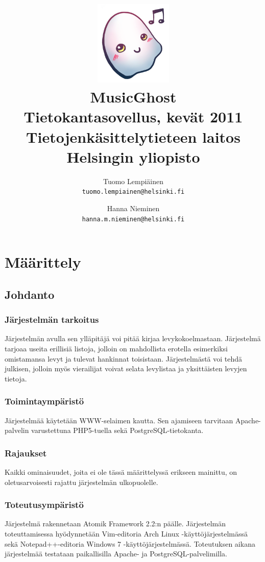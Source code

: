 \documentclass[a4paper,12pt]{report}
\title{\includegraphics[width=5em]{logo}\\\vspace{1em}MusicGhost\\\vspace{1em}
  \large{Tietokantasovellus, kevät 2011\\Tietojenkäsittelytieteen
  laitos\\Helsingin yliopisto}\\}
\author{Tuomo Lempiäinen\\\texttt{tuomo.lempiainen@helsinki.fi} \and
Hanna Nieminen\\\texttt{hanna.m.nieminen@helsinki.fi}}
\begin{document}
\maketitle

\tableofcontents

\chapter{Määrittely}

\section{Johdanto}

\subsection{Järjestelmän tarkoitus}

Järjestelmän avulla sen ylläpitäjä voi pitää kirjaa levykokoelmastaan.
Järjestelmä tarjoaa useita erillisiä listoja, jolloin on mahdollista
erotella esimerkiksi omistamansa levyt ja tulevat hankinnat toisistaan.
Järjestelmästä voi tehdä julkisen, jolloin myös vierailijat voivat selata
levylistaa ja yksittäisten levyjen tietoja.

\subsection{Toimintaympäristö}

Järjestelmää käytetään WWW-selaimen kautta. Sen ajamiseen tarvitaan
Apache-palvelin varustettuna PHP5-tuella sekä PostgreSQL-tietokanta.

\subsection{Rajaukset}

Kaikki ominaisuudet, joita ei ole tässä määrittelyssä erikseen mainittu, on
oletusarvoisesti rajattu järjestelmän ulkopuolelle.

\subsection{Toteutusympäristö}

Järjestelmä rakennetaan Atomik Framework 2.2:n päälle. Järjestelmän
toteuttamisessa hyödynnetään Vim-editoria Arch Linux -käyttöjärjestelmässä
sekä Notepad++-editoria Windows 7 -käyttöjärjestelmässä. Toteutuksen aikana
järjestelmää testataan paikallisilla Apache- ja PostgreSQL-palvelimilla.
\end{document}

